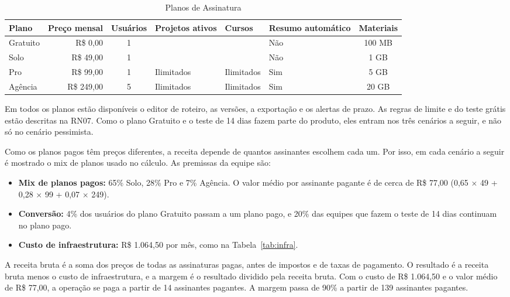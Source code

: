\begin{table}[H]
\centering
\small
\caption{Planos de Assinatura}
\label{tab:planos}
\begin{tabular}{|l|r|c|>{\centering\arraybackslash}p{1.7cm}|>{\centering\arraybackslash}p{1.7cm}|>{\centering\arraybackslash}p{1.8cm}|c|}
\hline
\textbf{Plano} & \textbf{Preço mensal} & \textbf{Usuários} & \textbf{Projetos ativos} & \textbf{Cursos} & \textbf{Resumo automático} & \textbf{Materiais} \\
\hline
Gratuito & R\$ 0,00 & 1 & 3 & 1 & Não & 100 MB \\
\hline
Solo & R\$ 49,00 & 1 & 10 & 5 & Não & 1 GB \\
\hline
Pro & R\$ 99,00 & 1 & Ilimitados & Ilimitados & Sim & 5 GB \\
\hline
Agência & R\$ 249,00 & 5 & Ilimitados & Ilimitados & Sim & 20 GB \\
\hline
\end{tabular}
\end{table}

Em todos os planos estão disponíveis o editor de roteiro, as versões, a exportação e os alertas de prazo. As regras de limite e do teste grátis estão descritas na RN07. Como o plano Gratuito e o teste de 14 dias fazem parte do produto, eles entram nos três cenários a seguir, e não só no cenário pessimista.

Como os planos pagos têm preços diferentes, a receita depende de quantos assinantes escolhem cada um. Por isso, em cada cenário a seguir é mostrado o mix de planos usado no cálculo. As premissas da equipe são:

\begin{itemize}
    \item \textbf{Mix de planos pagos:} 65\% Solo, 28\% Pro e 7\% Agência. O valor médio por assinante pagante é de cerca de R\$ 77,00 (0,65 $\times$ 49 + 0,28 $\times$ 99 + 0,07 $\times$ 249).
    \item \textbf{Conversão:} 4\% dos usuários do plano Gratuito passam a um plano pago, e 20\% das equipes que fazem o teste de 14 dias continuam no plano pago.
    \item \textbf{Custo de infraestrutura:} R\$ 1.064,50 por mês, como na Tabela~\ref{tab:infra}.
\end{itemize}

A receita bruta é a soma dos preços de todas as assinaturas pagas, antes de impostos e de taxas de pagamento. O resultado é a receita bruta menos o custo de infraestrutura, e a margem é o resultado dividido pela receita bruta. Com o custo de R\$ 1.064,50 e o valor médio de R\$ 77,00, a operação se paga a partir de 14 assinantes pagantes. A margem passa de 90\% a partir de 139 assinantes pagantes.

